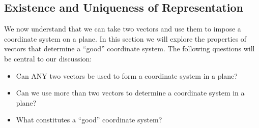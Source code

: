 \documentclass{ximera}
\begin{document}
\subsection*{Existence and Uniqueness of Representation}

We now understand that we can take two vectors and use them to impose a coordinate system on a plane.  In this section we will explore the properties of vectors that determine a ``good'' coordinate system.  The following questions will be central to our discussion:
\begin{itemize}
    \item Can ANY two vectors be used to form a coordinate system in a plane?
    \item Can we use more than two vectors to determine a coordinate system in a plane?
    \item What constitutes a ``good'' coordinate system?
\end{itemize}    
\end{document}
